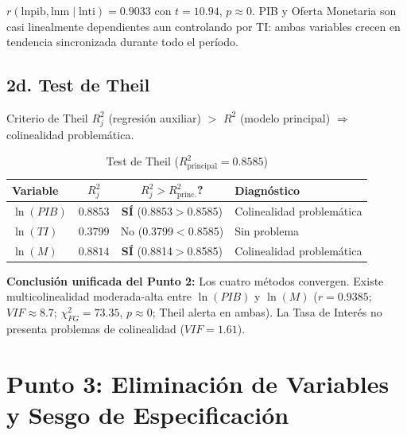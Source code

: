 \documentclass[12pt,a4paper]{article}
\begin{document}
\begin{resbox}
$r(\text{lnpib},\text{lnm}\mid\text{lnti})=0.9033$ con $t=10.94$, $p\approx0$.
PIB y Oferta Monetaria son casi linealmente dependientes aun controlando por TI:
ambas variables crecen en tendencia sincronizada durante todo el período.
\end{resbox}

\subsection{2d. Test de Theil}

\begin{frmbox}{Criterio de Theil}
$R_j^2$ (regresión auxiliar) $>$ $R^2$ (modelo principal) $\Rightarrow$ colinealidad problemática.
\end{frmbox}

\begin{table}[H]\centering
\caption{Test de Theil ($R^2_{\text{principal}}=0.8585$)}
\begin{tabular}{lccl}
\toprule
\textbf{Variable} & $R_j^2$ & $R_j^2>R^2_\text{princ.}$? & \textbf{Diagnóstico}\\
\midrule
\rowcolor{rojo_a!10}$\ln(PIB)$ & $0.8853$ & \textcolor{rojo_a}{\textbf{SÍ}} (0.8853$>$0.8585) & Colinealidad problemática\\
$\ln(TI)$ & $0.3799$ & No (0.3799$<$0.8585) & Sin problema\\
\rowcolor{rojo_a!10}$\ln(M)$ & $0.8814$ & \textcolor{rojo_a}{\textbf{SÍ}} (0.8814$>$0.8585) & Colinealidad problemática\\
\bottomrule
\end{tabular}
\end{table}

\begin{resbox}
\textbf{Conclusión unificada del Punto 2:} Los cuatro métodos convergen.
Existe multicolinealidad moderada-alta entre $\ln(PIB)$ y $\ln(M)$ ($r=0.9385$;
$VIF\approx8.7$; $\chi^2_{FG}=73.35$, $p\approx0$; Theil alerta en ambas).
La Tasa de Interés no presenta problemas de colinealidad ($VIF=1.61$).
\end{resbox}

\section{Punto 3: Eliminación de Variables y Sesgo de Especificación}
\end{document}
